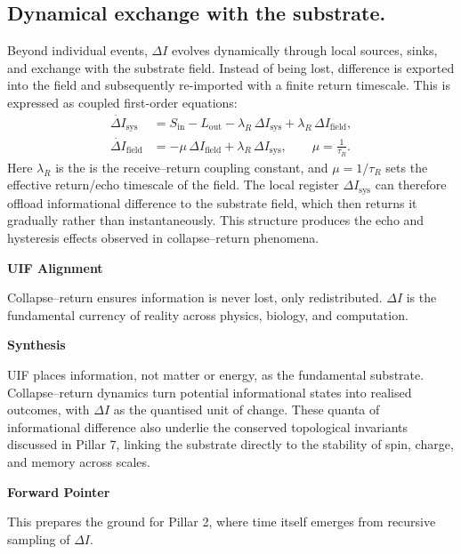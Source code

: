 \subsection* {Dynamical exchange with the substrate.}
Beyond individual events, $\Delta I$ evolves dynamically through local sources, sinks, and exchange with the substrate field. Instead of being lost, difference is exported into the field and
subsequently re-imported with a finite return timescale. This is expressed as coupled first-order equations:
\begin{subequations}
\label{eq:receive-return-coupled}
\begin{align}
\dot{\Delta I}_{\text{sys}} &= S_{\text{in}} - L_{\text{out}} - \lambda_R \,\Delta I_{\text{sys}} + \lambda_R \,\Delta I_{\text{field}}, \\
\dot{\Delta I}_{\text{field}} &= -\mu\,\Delta I_{\text{field}} + \lambda_R \,\Delta I_{\text{sys}}, \qquad \mu=\frac{1}{\tau_R}.
\end{align}
\end{subequations}
Here $\lambda_R$ is the is the receive–return coupling constant, and $\mu = 1/\tau_R$ sets the effective return/echo timescale of the field. The local register $\Delta I_{\text{sys}}$ can therefore offload informational difference to the substrate field, which then returns it gradually rather than instantaneously. This structure produces the echo and hysteresis effects observed in
collapse–return phenomena.
\newline

\noindent \textbf{UIF Alignment} 

\noindent Collapse–return ensures information is never lost, only redistributed. $\Delta I$ is the fundamental currency of reality across physics, biology, and computation.
\newline

\noindent \textbf{Synthesis} 

\noindent UIF places information, not matter or energy, as the fundamental substrate. Collapse–return dynamics turn potential informational states into realised outcomes, with $\Delta I$ as the
quantised unit of change. These quanta of informational difference also underlie the conserved topological invariants discussed in Pillar 7, linking the substrate directly to the stability of spin, charge, and memory across scales.
\newline

\noindent \textbf{Forward Pointer} 

\noindent This prepares the ground for Pillar 2, where time itself emerges from recursive sampling of $\Delta I$.
\newline

